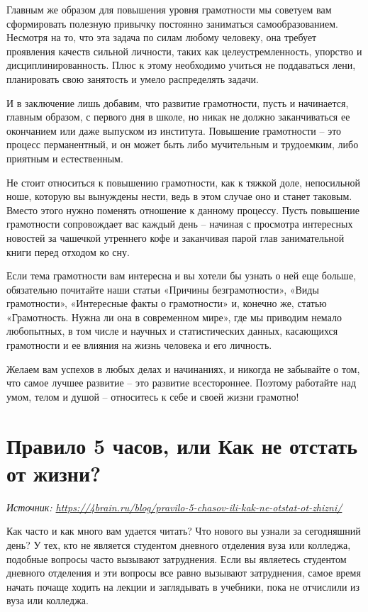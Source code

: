 Главным же образом для повышения уровня грамотности мы советуем вам сформировать полезную привычку постоянно заниматься самообразованием. Несмотря на то, что эта задача по силам любому человеку, она требует проявления качеств сильной личности, таких как целеустремленность, упорство и дисциплинированность. Плюс к этому необходимо учиться не поддаваться лени, планировать свою занятость и умело распределять задачи.

И в заключение лишь добавим, что развитие грамотности, пусть и начинается, главным образом, с первого дня в школе, но никак не должно заканчиваться ее окончанием или даже выпуском из института. Повышение грамотности – это процесс перманентный, и он может быть либо мучительным и трудоемким, либо приятным и естественным.

Не стоит относиться к повышению грамотности, как к тяжкой доле, непосильной ноше, которую вы вынуждены нести, ведь в этом случае оно и станет таковым. Вместо этого нужно поменять отношение к данному процессу. Пусть повышение грамотности сопровождает вас каждый день – начиная с просмотра интересных новостей за чашечкой утреннего кофе и заканчивая парой глав занимательной книги перед отходом ко сну.

Если тема грамотности вам интересна и вы хотели бы узнать о ней еще больше, обязательно почитайте наши статьи «Причины безграмотности», «Виды грамотности», «Интересные факты о грамотности» и, конечно же, статью «Грамотность. Нужна ли она в современном мире», где мы приводим немало любопытных, в том числе и научных и статистических данных, касающихся грамотности и ее влияния на жизнь человека и его личность.

Желаем вам успехов в любых делах и начинаниях, и никогда не забывайте о том, что самое лучшее развитие – это развитие всестороннее. Поэтому работайте над умом, телом и душой – относитесь к себе и своей жизни грамотно!

\clearpage

\section{Правило 5 часов, или Как не отстать от жизни?}

\textit{Источник: \url{https://4brain.ru/blog/pravilo-5-chasov-ili-kak-ne-otstat-ot-zhizni/}}

Как часто и как много вам удается читать? Что нового вы узнали за сегодняшний день? У тех, кто не является студентом дневного отделения вуза или колледжа, подобные вопросы часто вызывают затруднения. Если вы являетесь студентом дневного отделения и эти вопросы все равно вызывают затруднения, самое время начать почаще ходить на лекции и заглядывать в учебники, пока не отчислили из вуза или колледжа.

